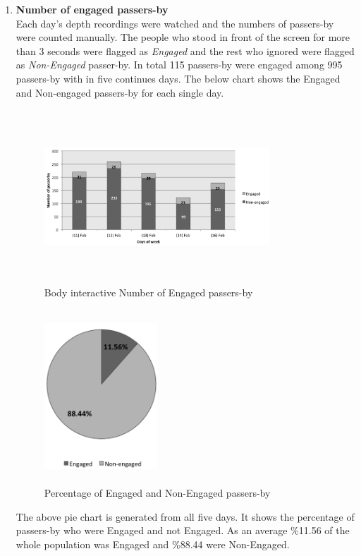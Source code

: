 \begin{enumerate}
\item \textbf{Number of engaged passers-by} \\
Each day’s depth recordings were watched and the numbers of passers-by were counted manually. The people who stood in front of the screen for more than 3 seconds were flagged as \emph{Engaged} and the rest who ignored were flagged as \emph{Non-Engaged} passer-by. In total 115 passers-by were engaged among 995 passers-by with in five continues days. The below chart shows the Engaged and Non-engaged passers-by for each single day.

\begin{figure}[H]
    \centering
    \includegraphics[width=0.8\textwidth,height=6.5cm]{Figures/8/body_inter_findings/body_inter_engage_day}
    \caption{Body interactive Number of Engaged passers-by}%
    \label{fig:bodyengagedandengagedby}%
\end{figure}


\begin{figure}[H]
    \centering
    \includegraphics[width=0.4\textwidth,height=6.5cm]{Figures/8/body_inter_findings/body_eng_percentage}
    \caption{Percentage of Engaged and Non-Engaged passers-by}%
    \label{fig:bodyengagedpasserbypercentage}%
\end{figure}

The above pie chart is generated from all five days. It shows the percentage of passers-by who were Engaged and not Engaged. As an average \%11.56 of the whole population was Engaged and \%88.44 were Non-Engaged.

\end{enumerate}


